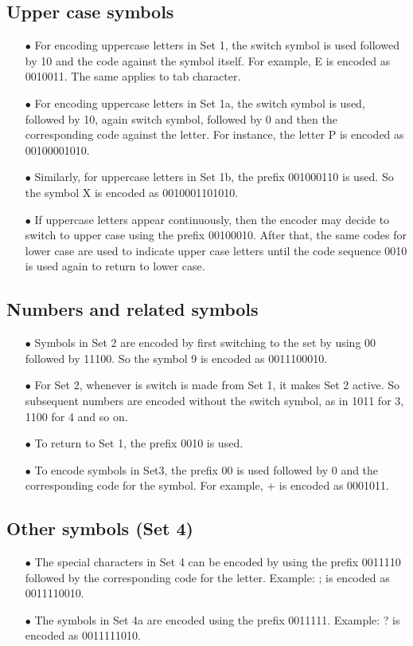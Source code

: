 \documentclass[]{article}
\begin{document}
\subsection{Upper case symbols}
\begin{itemize}
	\item[$\bullet$] For encoding uppercase letters in Set 1, the switch symbol is used followed by 10 and the code against the symbol itself.  For example, E is encoded as 0010011.  The same applies to tab character.
	\item[$\bullet$] For encoding uppercase letters in Set 1a, the switch symbol is used, followed by 10, again switch symbol, followed by 0 and then the corresponding code against the letter.  For instance, the letter P is encoded as 00100001010.
	\item[$\bullet$] Similarly, for uppercase letters in Set 1b, the prefix 001000110 is used.  So the symbol X is encoded as 0010001101010.
	\item[$\bullet$] If uppercase letters appear continuously, then the encoder may decide to switch to upper case using the prefix 00100010.  After that, the same codes for lower case are used to indicate upper case letters until the code sequence 0010 is used again to return to lower case.
\end{itemize}

\subsection{Numbers and related symbols}
\begin{itemize}
	\item[$\bullet$] Symbols in Set 2 are encoded by first switching to the set by using 00 followed by 11100.  So the symbol 9 is encoded as 0011100010.
	\item[$\bullet$] For Set 2, whenever is switch is made from Set 1, it makes Set 2 active. So subsequent numbers are encoded without the switch symbol, as in 1011 for 3, 1100 for 4 and so on.
	\item[$\bullet$] To return to Set 1, the prefix 0010 is used.
	\item[$\bullet$] To encode symbols in Set3, the prefix 00 is used followed by 0 and the corresponding code for the symbol.  For example, + is encoded as 0001011.
\end{itemize}

\subsection{Other symbols (Set 4)}
\begin{itemize}
	\item[$\bullet$] The special characters in Set 4 can be encoded by using the prefix 0011110 followed by the corresponding code for the letter.  Example: ; is encoded as 0011110010.
	\item[$\bullet$] The symbols in Set 4a are encoded using the prefix 0011111. Example: ? is encoded as 0011111010.
\end{itemize}
\end{document}
